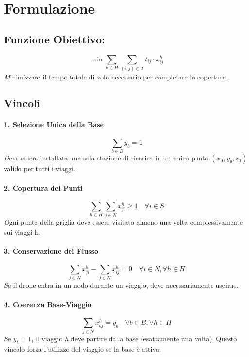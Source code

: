 \documentclass{article}
\begin{document}
\section{Formulazione}

\subsection{Funzione Obiettivo:}
\begin{equation}
    \min \sum_{h \in H} \sum_{(i,j) \in A} t_{ij} \cdot x_{ij}^h
\end{equation}
\textit   Minimizzare il tempo totale di volo necessario per completare la copertura.

\subsection{Vincoli}

\paragraph{1. Selezione Unica della Base}
\begin{equation}
    \sum_{b \in B} y_b = 1
\end{equation}
\textit   Deve essere installata una sola stazione di ricarica in un unico punto $(x_0, y_0, z_0)$ valido per tutti i viaggi.

\paragraph{2. Copertura dei Punti}
\begin{equation}
    \sum_{h \in H} \sum_{j \in N} x_{ji}^h \ge 1 \quad \forall i \in S
\end{equation}
\textit   Ogni punto della griglia deve essere visitato almeno una volta complessivamente sui viaggi h.

\paragraph{3. Conservazione del Flusso}
\begin{equation}
    \sum_{j \in N} x_{ji}^h - \sum_{j \in N} x_{ij}^h = 0 \quad \forall i \in N, \forall h \in H
\end{equation}
\textit   Se il drone entra in un nodo durante un viaggio, deve necessariamente uscirne.

\paragraph{4. Coerenza Base-Viaggio }
\begin{equation}
    \sum_{j \in N} x_{bj}^h = y_b \quad \forall b \in B, \forall h \in H
\end{equation}
\textit    Se $y_b=1$, il viaggio $h$ deve partire dalla base (esattamente una volta).
 Questo vincolo forza l'utilizzo del viaggio se la base è attiva.
\end{document}
